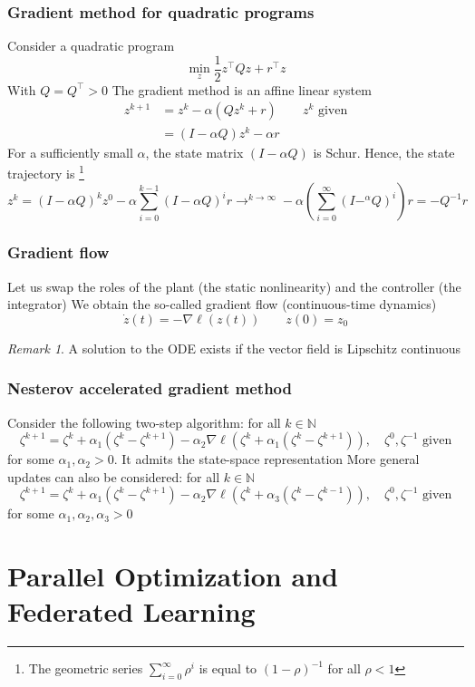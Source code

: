 \documentclass{book}
\newcommand{\N}{\mathbb{N}}
\theoremstyle{theoremv2}
\theoremstyle{defv2}
\theoremstyle{remark}
\newtheorem*{remark}{Remark}
\theoremstyle{remark}
\theoremstyle{definition}
\theoremstyle{definition}
\begin{document}
\subsection{Gradient method for quadratic programs}
Consider a quadratic program 
\[
    \min_z \displaystyle\frac{1}{2} z^\top Q z + r^\top z
\]
With $Q=Q^\top>0$
The gradient method is an affine linear system 
\begin{align*}
    z^{k+1} &= z^k -\alpha(Qz^k+r) \qquad z^k \text{ given}\\ 
    &= (I-\alpha Q) z^k - \alpha r
\end{align*}
For a sufficiently small $\alpha$, the state matrix $(I-\alpha Q)$ is Schur. Hence, the state trajectory is \footnote{The geometric series $\sum_{i=0}^{\infty}\rho^i$ is equal to $(1-\rho)^{-1}$ for all $\rho<1$} 
\[
    z^k = (I-\alpha Q)^kz^0 - \alpha \displaystyle\sum_{i=0}^{k-1}(I-\alpha Q)^ir \to^{k\to\infty} -\alpha\left(\displaystyle\sum_{i=0}^{\infty}(I-^\alpha Q)^i\right)r = -Q^{-1}r
\]
\subsection{Gradient flow}
Let us swap the roles of the plant (the static nonlinearity) and the controller (the integrator)
We obtain the so-called gradient flow (continuous-time dynamics)
\[
    \dot{z}(t) = -\nabla \ell(z(t)) \qquad z(0) = z_0
\]
\begin{remark}
    A solution to the ODE exists if the vector field is Lipschitz continuous
\end{remark}
\subsection{Nesterov accelerated gradient method}
Consider the following two-step algorithm: for all $k\in\N$
\[
    \zeta^{k+1} = \zeta^k + \alpha_1(\zeta^k-\zeta^{k+1}) - \alpha_2\nabla\ell \left(\zeta^k + \alpha_1(\zeta^k-\zeta^{k+1})\right), \quad \zeta^0, \zeta^{-1} \text{ given}
\]
for some $\alpha_1,\alpha_2>0$. It admits the state-space representation
More general updates can also be considered: for all $k\in\N$
\[
    \zeta^{k+1} = \zeta^k + \alpha_1(\zeta^k-\zeta^{k+1})-\alpha_2\nabla\ell\left(\zeta^k+\alpha_3(\zeta^k-\zeta^{k-1})\right), \quad \zeta^0,\zeta^{-1} \text{ given}
\]
for some $\alpha_1, \alpha_2, \alpha_3>0$

\chapter{Parallel Optimization and Federated Learning}
\end{document}
